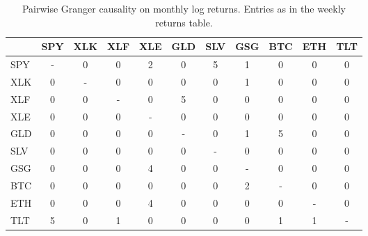 \begin{table}[H]
\centering
\small
\begin{tabular}{lcccccccccc}
\toprule
 & SPY & XLK & XLF & XLE & GLD & SLV & GSG & BTC & ETH & TLT \\
\midrule
SPY & - & 0 & 0 & 2 & 0 & 5 & 1 & 0 & 0 & 0 \\
XLK & 0 & - & 0 & 0 & 0 & 0 & 1 & 0 & 0 & 0 \\
XLF & 0 & 0 & - & 0 & 5 & 0 & 0 & 0 & 0 & 0 \\
XLE & 0 & 0 & 0 & - & 0 & 0 & 0 & 0 & 0 & 0 \\
GLD & 0 & 0 & 0 & 0 & - & 0 & 1 & 5 & 0 & 0 \\
SLV & 0 & 0 & 0 & 0 & 0 & - & 0 & 0 & 0 & 0 \\
GSG & 0 & 0 & 0 & 4 & 0 & 0 & - & 0 & 0 & 0 \\
BTC & 0 & 0 & 0 & 0 & 0 & 0 & 2 & - & 0 & 0 \\
ETH & 0 & 0 & 0 & 4 & 0 & 0 & 0 & 0 & - & 0 \\
TLT & 5 & 0 & 1 & 0 & 0 & 0 & 0 & 1 & 1 & - \\
\bottomrule
\end{tabular}
\caption{Pairwise Granger causality on monthly log returns. Entries as in the weekly returns table.}
\label{tab:returns_monthly}
\end{table}